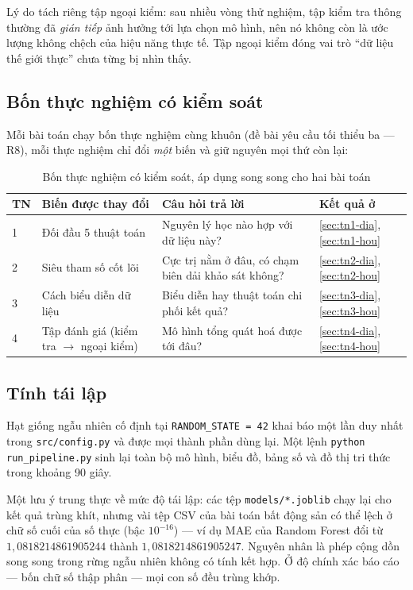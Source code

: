 Lý do tách riêng tập ngoại kiểm: sau nhiều vòng thử nghiệm, tập kiểm tra thông
thường đã \emph{gián tiếp} ảnh hưởng tới lựa chọn mô hình, nên nó không còn là
ước lượng không chệch của hiệu năng thực tế. Tập ngoại kiểm đóng vai trò ``dữ
liệu thế giới thực'' chưa từng bị nhìn thấy.

\subsection{Bốn thực nghiệm có kiểm soát}

Mỗi bài toán chạy bốn thực nghiệm cùng khuôn (đề bài yêu cầu tối thiểu ba ---
R8), mỗi thực nghiệm chỉ đổi \emph{một} biến và giữ nguyên mọi thứ còn lại:

\begin{table}[H]
\centering
\caption{Bốn thực nghiệm có kiểm soát, áp dụng song song cho hai bài toán}
\label{tab:bon-thucnghiem}
\small
\begin{tabularx}{\textwidth}{@{}L{0.8cm}L{3.5cm}XL{2.3cm}@{}}
\toprule
\textbf{TN} & \textbf{Biến được thay đổi} & \textbf{Câu hỏi trả lời} & \textbf{Kết quả ở} \\
 & Đối đầu 5 thuật toán & Nguyên lý học nào hợp với dữ liệu này? & \ref{sec:tn1-dia}, \ref{sec:tn1-hou} \\
2 & Siêu tham số cốt lõi & Cực trị nằm ở đâu, có chạm biên dải khảo sát không? & \ref{sec:tn2-dia}, \ref{sec:tn2-hou} \\
3 & Cách biểu diễn dữ liệu & Biểu diễn hay thuật toán chi phối kết quả? & \ref{sec:tn3-dia}, \ref{sec:tn3-hou} \\
4 & Tập đánh giá (kiểm tra $\to$ ngoại kiểm) & Mô hình tổng quát hoá được tới đâu? & \ref{sec:tn4-dia}, \ref{sec:tn4-hou} \\
\bottomrule
\end{tabularx}
\end{table}

\subsection{Tính tái lập}
\label{sec:tailap}

Hạt giống ngẫu nhiên cố định tại \texttt{RANDOM\_STATE = 42} khai báo một lần
duy nhất trong \texttt{src/config.py} và được mọi thành phần dùng lại. Một lệnh
\texttt{python run\_pipeline.py} sinh lại toàn bộ mô hình, biểu đồ, bảng số và
đồ thị tri thức trong khoảng 90 giây.

Một lưu ý trung thực về mức độ tái lập: các tệp \texttt{models/*.joblib} chạy
lại cho kết quả trùng khít, nhưng vài tệp CSV của bài toán bất động sản có thể
lệch ở chữ số cuối của số thực (bậc $10^{-16}$) --- ví dụ MAE của Random Forest
đổi từ $1{,}0818214861905244$ thành $1{,}0818214861905247$. Nguyên nhân là phép
cộng dồn song song trong rừng ngẫu nhiên không có tính kết hợp. Ở độ chính xác
báo cáo --- bốn chữ số thập phân --- mọi con số đều trùng khớp.
